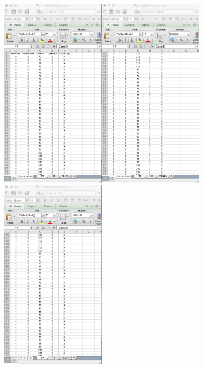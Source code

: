 \documentclass[]{book}
\begin{document}
\includegraphics[width=0.4\textwidth,height=\textheight]{images/ROC-TP-1.png}\includegraphics[width=0.4\textwidth,height=\textheight]{images/ROC-TP-2.png}\includegraphics[width=0.4\textwidth,height=\textheight]{images/ROC-TP-3.png}
\end{document}
